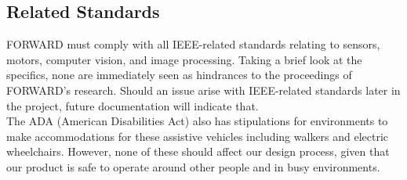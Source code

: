 \subsection{Related Standards}
\noindent FORWARD must comply with all IEEE-related standards relating to sensors, motors, computer vision, and image processing. Taking a brief look at the specifics, none are immediately seen as hindrances to the proceedings of FORWARD’s research. Should an issue arise with IEEE-related standards later in the project, future documentation will indicate that. \\

\noindent The ADA (American Disabilities Act) also has stipulations for environments to make accommodations for these assistive vehicles including walkers and electric wheelchairs. However, none of these should affect our design process, given that our product is safe to operate around other people and in busy environments.